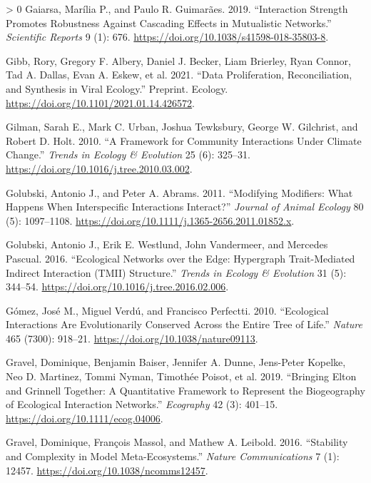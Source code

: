 \documentclass[11pt]{article}
\newlength{\cslhangindent}
\newenvironment{CSLReferences}[3] %
 {%
  \setlength{\parindent}{0pt}
  \ifodd #1 \everypar{\setlength{\hangindent}{\cslhangindent}}\ignorespaces\fi
  \ifnum #2 > 0
  \setlength{\parskip}{#2\baselineskip}
  \fi
 }%
 {}
\begin{document}
\begin{CSLReferences}{1}{0}
\leavevmode\hypertarget{ref-Gaiarsa2019IntStr}{}%
Gaiarsa, Marília P., and Paulo R. Guimarães. 2019. {``Interaction
Strength Promotes Robustness Against Cascading Effects in Mutualistic
Networks.''} \emph{Scientific Reports} 9 (1): 676.
\url{https://doi.org/10.1038/s41598-018-35803-8}.

\leavevmode\hypertarget{ref-Gibb2021DatPro}{}%
Gibb, Rory, Gregory F. Albery, Daniel J. Becker, Liam Brierley, Ryan
Connor, Tad A. Dallas, Evan A. Eskew, et al. 2021. {``Data
Proliferation, Reconciliation, and Synthesis in Viral Ecology.''}
Preprint. Ecology. \url{https://doi.org/10.1101/2021.01.14.426572}.

\leavevmode\hypertarget{ref-Gilman2010FraCom}{}%
Gilman, Sarah E., Mark C. Urban, Joshua Tewksbury, George W. Gilchrist,
and Robert D. Holt. 2010. {``A Framework for Community Interactions
Under Climate Change.''} \emph{Trends in Ecology \& Evolution} 25 (6):
325--31. \url{https://doi.org/10.1016/j.tree.2010.03.002}.

\leavevmode\hypertarget{ref-Golubski2011ModMod}{}%
Golubski, Antonio J., and Peter A. Abrams. 2011. {``Modifying Modifiers:
What Happens When Interspecific Interactions Interact?''} \emph{Journal
of Animal Ecology} 80 (5): 1097--1108.
\url{https://doi.org/10.1111/j.1365-2656.2011.01852.x}.

\leavevmode\hypertarget{ref-Golubski2016EcoNet}{}%
Golubski, Antonio J., Erik E. Westlund, John Vandermeer, and Mercedes
Pascual. 2016. {``Ecological Networks over the Edge: Hypergraph
Trait-Mediated Indirect Interaction (TMII) Structure.''} \emph{Trends in
Ecology \& Evolution} 31 (5): 344--54.
\url{https://doi.org/10.1016/j.tree.2016.02.006}.

\leavevmode\hypertarget{ref-Gomez2010EcoInt}{}%
Gómez, José M., Miguel Verdú, and Francisco Perfectti. 2010.
{``Ecological Interactions Are Evolutionarily Conserved Across the
Entire Tree of Life.''} \emph{Nature} 465 (7300): 918--21.
\url{https://doi.org/10.1038/nature09113}.

\leavevmode\hypertarget{ref-Gravel2019BriElt}{}%
Gravel, Dominique, Benjamin Baiser, Jennifer A. Dunne, Jens-Peter
Kopelke, Neo D. Martinez, Tommi Nyman, Timothée Poisot, et al. 2019.
{``Bringing Elton and Grinnell Together: A Quantitative Framework to
Represent the Biogeography of Ecological Interaction Networks.''}
\emph{Ecography} 42 (3): 401--15.
\url{https://doi.org/10.1111/ecog.04006}.

\leavevmode\hypertarget{ref-Gravel2016StaCom}{}%
Gravel, Dominique, François Massol, and Mathew A. Leibold. 2016.
{``Stability and Complexity in Model Meta-Ecosystems.''} \emph{Nature
Communications} 7 (1): 12457. \url{https://doi.org/10.1038/ncomms12457}.


\end{CSLReferences}
\end{document}
